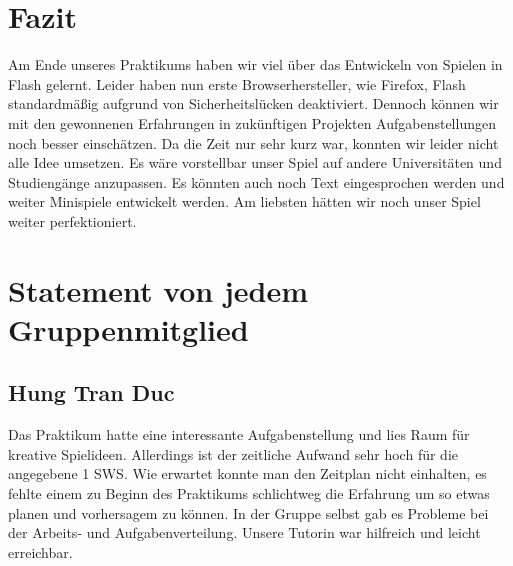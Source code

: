 \documentclass[a4paper, 11pt]{article} %
\begin{document}
\section{Fazit}
Am Ende unseres Praktikums haben wir viel über das Entwickeln von Spielen in Flash gelernt. Leider haben nun erste Browserhersteller, wie Firefox, Flash standardmäßig aufgrund von Sicherheitslücken deaktiviert. Dennoch können wir mit den gewonnenen Erfahrungen in zukünftigen Projekten Aufgabenstellungen noch besser einschätzen. Da die Zeit nur sehr kurz war, konnten wir leider nicht alle Idee umsetzen. Es wäre vorstellbar unser Spiel auf andere Universitäten und Studiengänge anzupassen. Es könnten auch noch Text eingesprochen werden und weiter Minispiele entwickelt werden. Am liebsten hätten wir noch unser Spiel weiter perfektioniert.

\section{Statement von jedem Gruppenmitglied}
\subsection{Hung Tran Duc}
Das Praktikum hatte eine interessante Aufgabenstellung und lies Raum für kreative Spielideen.
Allerdings ist der zeitliche Aufwand sehr hoch für die angegebene 1 SWS.
Wie erwartet konnte man den Zeitplan nicht einhalten, es fehlte einem zu Beginn des Praktikums schlichtweg 
die Erfahrung um so etwas planen und vorhersagem zu können.
In der Gruppe selbst gab es Probleme bei der Arbeits- und Aufgabenverteilung.
Unsere Tutorin war hilfreich und leicht erreichbar.
\end{document}
